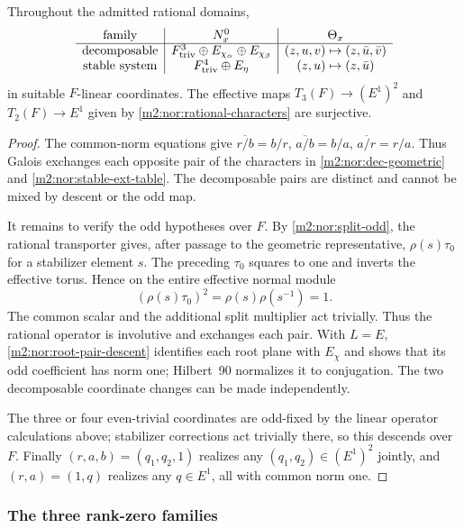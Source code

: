 \begin{proposition}\label{m2:nor:rankone-rational}
Throughout the admitted rational domains,
\begin{equation}\label{m2:nor:rankone-forms}
 \begin{array}{c|c|c}
 \text{family}&N_x^0&\Theta_x\\\hline
 \text{decomposable}&F^3_{\mathrm{triv}}\oplus E_{\chi_\alpha}
                 \oplus E_{\chi_\beta}&(z,u,v)\mapsto(z,\bar u,\bar v)\\
 \text{stable system}&F^4_{\mathrm{triv}}\oplus E_\eta
                 &(z,u)\mapsto(z,\bar u)
 \end{array}
\end{equation}
in suitable $F$-linear coordinates. The effective maps
$T_3(F)\to(E^1)^2$ and $T_2(F)\to E^1$ given by
\eqref{m2:nor:rational-characters} are surjective.
\end{proposition}
\begin{proof}
The common-norm equations give
$\overline{r/b}=b/r$, $\overline{a/b}=b/a$, $\overline{a/r}=r/a$.
Thus Galois exchanges each opposite pair of the characters in
\eqref{m2:nor:dec-geometric} and \eqref{m2:nor:stable-ext-table}.
The decomposable pairs are distinct and cannot be mixed by descent
or the odd map.

It remains to verify the odd hypotheses over $F$. By
\eqref{m2:nor:split-odd}, the rational transporter gives, after passage
to the geometric representative, $\rho(s)\tau_0$ for a stabilizer
element $s$. The preceding $\tau_0$ squares to one and inverts the
effective torus. Hence on the entire effective normal module
\[
 (\rho(s)\tau_0)^2=\rho(s)\rho(s^{-1})=1.
\]
The common scalar and the additional split multiplier act trivially.
Thus the rational operator is involutive and exchanges each pair.
With $L=E$, \cref{m2:nor:root-pair-descent} identifies each root plane
with $E_\chi$ and shows that its odd coefficient has norm one;
Hilbert~90 normalizes it to conjugation. The two decomposable
coordinate changes can be made independently.

The three or four even-trivial coordinates are odd-fixed by the
linear operator calculations above; stabilizer corrections act
trivially there, so this descends over $F$. Finally
$(r,a,b)=(q_1,q_2,1)$ realizes any $(q_1,q_2)\in(E^1)^2$ jointly,
and $(r,a)=(1,q)$ realizes any $q\in E^1$, all with common norm one.
\end{proof}

\subsubsection{The three rank-zero families}

